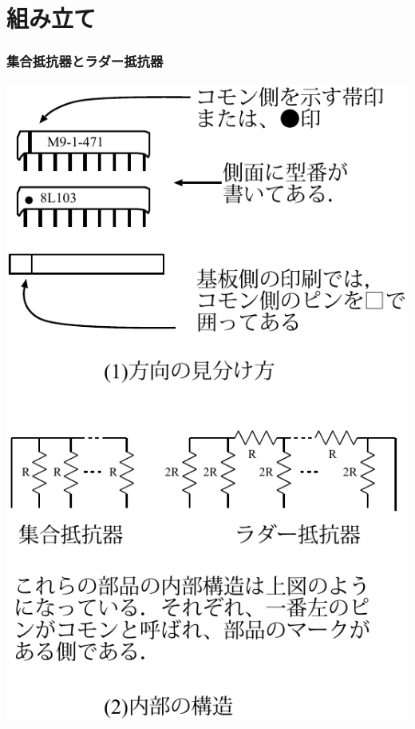 \documentclass[handout]{beamer}        %
\begin{document}
\section{組み立て}
\begin{frame}
  \frametitle{集合抵抗器とラダー抵抗器}
  \begin{minipage}{0.45\columnwidth}
    \includegraphics[scale=0.56]{../chap3/syuugou.pdf}
  \end{minipage}
  \begin{minipage}{0.54\columnwidth}
    \begin{center}
      {\footnotesize\begin{tabular}{l|l|l}

\end{tabular}}
\end{center}
\end{minipage}
\end{frame}
\end{document}
